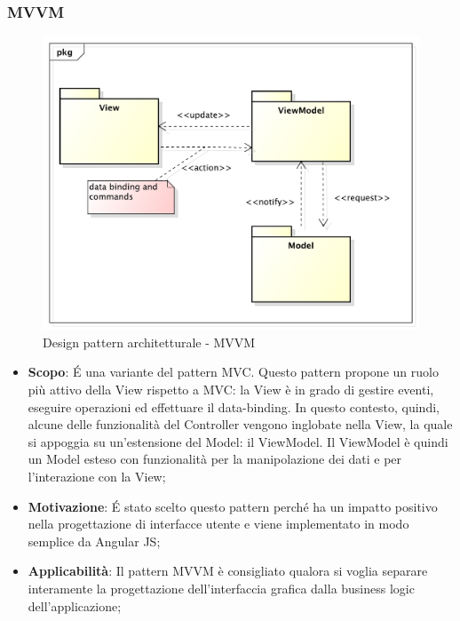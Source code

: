 		\newpage
		\subsubsection{MVVM} %
		\begin{figure}[htbp]
			\centering
			\centerline{\includegraphics[scale=0.5]{./images/designpatternappendice/mvvm.pdf}}
			\caption{Design pattern architetturale - MVVM}
		\end{figure}

		\begin{itemize}
			\item \textbf{Scopo}: \'E una variante del pattern MVC. Questo pattern propone un ruolo più attivo della View rispetto a MVC: la View è in grado di gestire eventi, eseguire operazioni ed effettuare il data-binding. In questo contesto, quindi, alcune delle funzionalità del Controller vengono inglobate nella View, la quale si appoggia su un'estensione del Model: il ViewModel.
Il ViewModel è quindi un Model esteso con funzionalità per la manipolazione dei dati e per l'interazione con la View;

			\item \textbf{Motivazione}: \'E stato scelto questo pattern perché ha un impatto positivo nella progettazione di interfacce utente e viene implementato in modo semplice da Angular JS;

			\item \textbf{Applicabilità}: Il pattern MVVM è consigliato qualora si voglia separare interamente la progettazione dell'interfaccia grafica dalla business logic dell'applicazione;

		\end{itemize}


